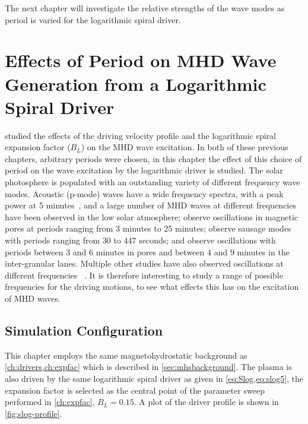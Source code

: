 \documentclass[a4paper,12pt,fourier,authoryear,custommargin]{Classes/PhDThesisPSnPDF}
\begin{document}
The next chapter will investigate the relative strengths of the wave modes as period is varied for the logarithmic spiral driver.
\clearpage{}%
%

%
\clearpage{}%

\chapter{Effects of Period on MHD Wave Generation from a Logarithmic Spiral Driver}\label{ch:period}

 studied the effects of the driving velocity profile and the logarithmic spiral expansion factor ($B_L$) on the MHD wave excitation.
In both of these previous chapters, arbitrary periods were chosen, in this chapter the effect of this choice of period on the wave excitation by the logarithmic driver is studied.
The solar photosphere is populated with an outstanding variety of different frequency wave modes.
Acoustic (p-mode) waves have a wide frequency spectra, with a peak power at 5 minutes~\citep{leighton1962}, and a large number of MHD waves at different frequencies have been observed in the low solar atmosphere; \cite{Freij2014,Dorotovic2014} observe oscillations in magnetic pores at periods ranging from 3 minutes to 25 minutes; \cite{morton2011} observe sausage modes with periods ranging from $30$ to $447$ seconds; and \cite{fujimura2009} observe oscillations with periods between $3$ and $6$ minutes in pores and between $4$ and $9$ minutes in the inter-granular lanes.
Multiple other studies have also observed oscillations at different frequencies ~\cite[e.g.][]{mathioudakis2013,reznikova2012,morton2012,mcintosh2011,zaqarashvili2009,jess2009,vecchio2007,kobanov2006,bogdan2006}.
It is therefore interesting to study a range of possible frequencies for the driving motions, to see what effects this has on the excitation of MHD waves.

\section{Simulation Configuration}\label{sec:periodconfig}
This chapter employs the same magnetohydrostatic background as \cref{ch:drivers,ch:expfac} which is described in \cref{sec:mhsbackground}.
The plasma is also driven by the same logarithmic spiral driver as given in \cref{eq:Slog,eq:slog5}, the expansion factor is selected as the central point of the parameter sweep performed in \cref{ch:expfac}, $B_L=0.15$.
A plot of the driver profile is shown in \cref{fig:slog-profile}.
\end{document}
